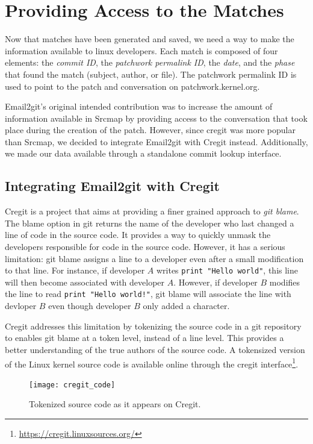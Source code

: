 \section{Providing Access to the Matches} 

Now that matches have been generated and saved, we need a way to make the information available to linux developers. Each match is composed of four elements: the \textit{commit ID}, the \textit{patchwork permalink ID}, the \textit{date}, and the \textit{phase} that found the match (subject, author, or file). The patchwork permalink ID is used to point to the patch and conversation on patchwork.kernel.org.

Email2git's original intended contribution was to increase the amount of information available in Srcmap by providing access to the conversation that took place during the creation of the patch. However, since cregit was more popular than Srcmap, we decided to integrate Email2git with Cregit instead. Additionally, we made our data available through a standalone commit lookup interface.

\subsection{Integrating Email2git with Cregit}

Cregit is a project that aims at providing a finer grained approach to \textit{git blame}. The blame option in git returns the name of the developer who last changed a line of code in the source code. It provides a way to quickly unmask the developers responsible for code in the source code. However, it has a serious limitation: git blame assigns a line to a developer even after a small modification to that line. For instance, if developer $A$ writes \texttt{print "Hello world"}, this line will then become associated with developer $A$. However, if developer $B$ modifies the line to read \texttt{print "Hello world!"}, git blame will associate the line with devloper $B$ even though developer $B$ only added a character. 

Cregit addresses this limitation by tokenizing the source code in a git repository to enables git blame at a token level, instead of a line level. This provides a better understanding of the true authors of the source code. A tokensized version of the Linux kernel source code is available online through the cregit interface\footnote{\url{https://cregit.linuxsources.org/}}.

\begin{figure}[htb]
\centering
\texttt{[image: cregit\_code]}
\caption{Tokenized source code as it appears on Cregit.}
\label{fig:cregit_code}
\end{figure}

